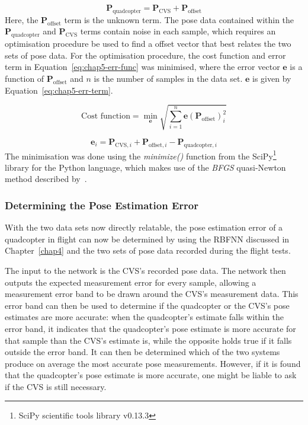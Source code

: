 \begin{equation}
  \label{eq:chap5-pose-offset}
  \bm{P}_{\mathrm{quadcopter}} = \bm{P}_{\mathrm{CVS}} + \bm{P}_{\mathrm{offset}}
\end{equation}
Here, the $\bm{P}_{\mathrm{offset}}$ term is the unknown term. The pose data contained within the $\bm{P}_{\mathrm{quadcopter}}$ and $\bm{P}_{\mathrm{CVS}}$ terms contain noise in each sample, which requires an optimisation procedure be used to find a offset vector that best relates the two sets of pose data. For the optimisation procedure, the cost function and error term in Equation~\ref{eq:chap5-err-func} was minimised, where the error vector $\bm{e}$ is a function of $\bm{P}_{\mathrm{offset}}$ and $n$ is the number of samples in the data set. $\bm{e}$ is given by Equation~\ref{eq:chap5-err-term}. 

\begin{equation}
  \label{eq:chap5-err-func}
  \text{Cost function} = \min_{\bm{e}}\sqrt{\displaystyle\sum_{i=1}^{n} \bm{e}(\bm{P}_{\mathrm{offset}})_i^2}
\end{equation}

\begin{equation}
  \label{eq:chap5-err-term}
  \bm{e}_i = \bm{P}_{\mathrm{CVS}, i} + \bm{P}_{\mathrm{offset}, i} - \bm{P}_{\mathrm{quadcopter}, i}
\end{equation}
The minimisation was done using the \emph{minimize()} function from the SciPy\footnote{SciPy scientific tools library v0.13.3} library for the Python language, which makes use of the \emph{BFGS} quasi-Newton method described by~\cite{nocedal2006numerical}. 

\subsubsection{Determining the Pose Estimation Error}

With the two data sets now directly relatable, the pose estimation error of a quadcopter in flight can now be determined by using the RBFNN discussed in Chapter~\ref{chap4} and the two sets of pose data recorded during the flight tests.  

The input to the network is the CVS's recorded pose data. The network then outputs the expected measurement error for every sample, allowing a measurement error band to be drawn around the CVS's measurement data. This error band can then be used to determine if the quadcopter or the CVS's pose estimates are more accurate: when the quadcopter's estimate falls within the error band, it indicates that the quadcopter's pose estimate is more accurate for that sample than the CVS's estimate is, while the opposite holds true if it falls outside the error band. It can then be determined which of the two systems produce on average the most accurate pose measurements. However, if it is found that the quadcopter's pose estimate is more accurate, one might be liable to ask if the CVS is still necessary.

